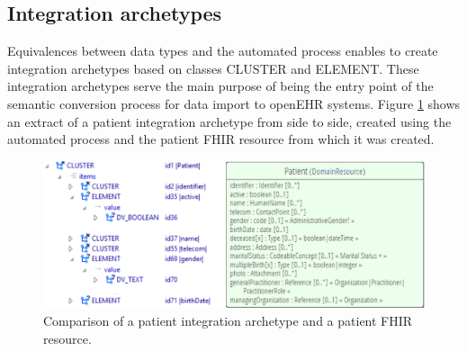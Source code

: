 \subsection{Integration archetypes}

Equivalences between data types and the automated process enables to create integration archetypes based on classes CLUSTER and ELEMENT. These integration ar\-chetypes serve the main purpose of being the entry point of the semantic conversion process for data import to open\-EHR systems. Figure \ref{fig:comparison} shows an extract of a patient integration archetype from side to side, created using the automated process and the patient FHIR resource from which it was created.

\begin{figure}
  \centering
  \includegraphics[scale=0.8]{./images/comparison_patient}
  \caption{Comparison of a patient integration archetype and a patient FHIR resource.}
  \label{fig:comparison}
\end{figure}
